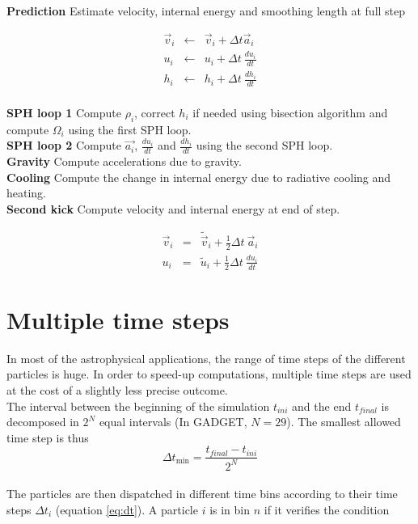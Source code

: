 \documentclass[a4paper,10pt]{article}
\begin{document}
\textbf{Prediction} Estimate velocity, internal energy and smoothing length at full step

\begin{eqnarray*}
\vec{v}_i &\leftarrow& \vec{v}_i + \Delta t \vec{a}_i \\
u_i &\leftarrow& u_i + \Delta t ~\frac{du_i}{dt} \\
h_i &\leftarrow& h_i + \Delta t ~\frac{dh_i}{dt} \\
\end{eqnarray*}

\textbf{SPH loop 1} Compute $\rho_i$, correct $h_i$ if needed using bisection algorithm and compute $\Omega_i$ using the
first SPH loop. \\

\textbf{SPH loop 2} Compute $\vec{a_i}$, $\frac{du_i}{dt}$ and $\frac{dh_i}{dt}$ using the second SPH loop. \\

\textbf{Gravity} Compute accelerations due to gravity. \\

\textbf{Cooling} Compute the change in internal energy due to radiative cooling and heating. \\

\textbf{Second kick} Compute velocity and internal energy at end of step. 

\begin{eqnarray*}
 \vec{v}_i &=& \tilde{\vec{v}}_i + \textstyle\frac{1}{2}\Delta t ~\vec{a}_i \\
 u_i &=& \tilde{u}_i + \textstyle\frac{1}{2}\Delta t ~\frac{du_i}{dt}
\end{eqnarray*}

\section{Multiple time steps}

In most of the astrophysical applications, the range of time steps of the different particles is huge. In order to
speed-up computations, multiple time steps are used at the cost of a slightly less precise outcome. \\
The interval between the beginning of the simulation $t_{ini}$ and the end $t_{final}$ is decomposed in $2^N$ equal
intervals (In GADGET, $N=29$). The smallest allowed time step is thus
\begin{equation}
 \Delta t_{\min} = \frac{t_{final} - t_{ini}}{2^N}
\end{equation}
\\
The particles are then dispatched in different time bins according to their time steps $\Delta t_i$ (equation
\ref{eq:dt}). A particle $i$ is in bin $n$ if it verifies the condition
\end{document}
